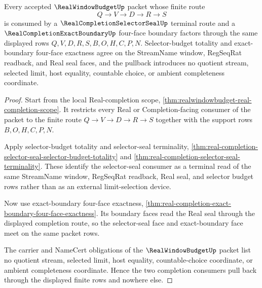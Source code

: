 \begin{theorem}
\label{thm:real-window-budget-terminal-pullback-coherence}
Every accepted $\RealWindowBudgetUp$ packet whose finite route
$$
Q \to V \to D \to R \to S
$$
is consumed by a $\RealCompletionSelectorSealUp$ terminal route and a
$\RealCompletionExactBoundaryUp$ four-face boundary factors through the same
displayed rows $Q,V,D,R,S,B,O,H,C,P,N$. Selector-budget totality and
exact-boundary four-face exactness agree on the StreamName window, RegSeqRat
readback, and Real seal faces, and the pullback introduces no quotient stream,
selected limit, host equality, countable choice, or ambient completeness
coordinate.
\end{theorem}
\begin{proof}
Start from the local Real-completion scope,
\autoref{thm:realwindowbudget-real-completion-scope}. It restricts every Real
or Completion-facing consumer of the packet to the finite route
$Q \to V \to D \to R \to S$ together with the support rows $B,O,H,C,P,N$.

Apply selector-budget totality and selector-seal terminality,
\autoref{thm:real-completion-selector-seal-selector-budget-totality} and
\autoref{thm:real-completion-selector-seal-terminality}. These identify the
selector-seal consumer as a terminal read of the same StreamName window,
RegSeqRat readback, Real seal, and selector budget rows rather than as an
external limit-selection device.

Now use exact-boundary four-face exactness,
\autoref{thm:real-completion-exact-boundary-four-face-exactness}. Its boundary
faces read the Real seal through the displayed completion route, so the
selector-seal face and exact-boundary face meet on the same packet rows.

The carrier and NameCert obligations of the $\RealWindowBudgetUp$ packet list
no quotient stream, selected limit, host equality, countable-choice coordinate,
or ambient completeness coordinate. Hence the two completion consumers pull
back through the displayed finite rows and nowhere else.
\end{proof}

